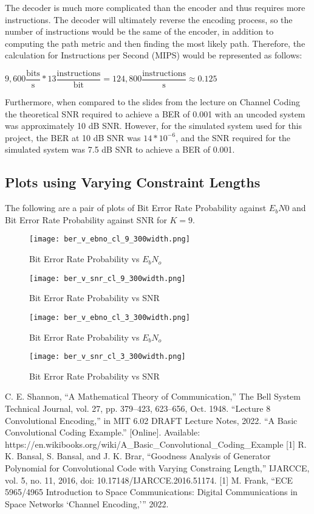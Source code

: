 \documentclass[conference]{IEEEtran}
\begin{document}
The decoder is much more complicated than the encoder and thus requires more instructions. The decoder will ultimately reverse the encoding process, so the number of instructions would be the same of the encoder, in addition to computing the path metric and then finding the most likely path. Therefore, the calculation for Instructions per Second (MIPS) would be represented as follows:
\begin{center}
    $9,600 \dfrac{\text{bits}}{\text{s}}*13\dfrac{\text{instructions}}{\text{bit}}=124,800 \dfrac{\text{instructions}}{\text{s}} \approx 0.125$
\end{center}


Furthermore, when compared to the slides from the lecture on Channel Coding \cite{b5} the theoretical SNR required to achieve a BER of 0.001 with an uncoded system was approximately 10 dB SNR. However, for the simulated system used for this project, the BER at 10 dB SNR was $14*10^{-6}$, and the SNR required for the simulated system was 7.5 dB SNR to achieve a BER of 0.001. 

\subsection{Plots using Varying Constraint Lengths}
The following are a pair of plots of Bit Error Rate Probability against $E_b N0$ and Bit Error Rate Probability against SNR for $K=9$. 
\begin{figure}[!ht]
\centerline{\texttt{[image: ber\_v\_ebno\_cl\_9\_300width.png]}}
\caption{Bit Error Rate Probability vs $E_b N_o$}
\label{fig:4}
\end{figure}
\begin{figure}[!ht]
\centerline{\texttt{[image: ber\_v\_snr\_cl\_9\_300width.png]}}
\caption{Bit Error Rate Probability vs SNR}
\label{fig:5}
\end{figure}

\begin{figure}[!ht]
\centerline{\texttt{[image: ber\_v\_ebno\_cl\_3\_300width.png]}}
\caption{Bit Error Rate Probability vs $E_b N_o$}
\label{fig:6}
\end{figure}
\begin{figure}[!ht]
\centerline{\texttt{[image: ber\_v\_snr\_cl\_3\_300width.png]}}
\caption{Bit Error Rate Probability vs SNR}
\label{fig:7}
\end{figure}

\begin{thebibliography}{00}
 C. E. Shannon, “A Mathematical Theory of Communication,” The Bell System Technical Journal, vol. 27, pp. 379–423, 623–656, Oct. 1948.
 “Lecture 8 Convolutional Encoding,” in MIT 6.02 DRAFT Lecture Notes, 2022.
 “A Basic Convolutional Coding Example.” [Online]. Available: https://en.wikibooks.org/wiki/A\_Basic\_Convolutional\_Coding\_Example
 [1] R. K. Bansal, S. Bansal, and J. K. Brar, “Goodness Analysis of Generator Polynomial for Convolutional Code with Varying Constraing Length,” IJARCCE, vol. 5, no. 11, 2016, doi: 10.17148/IJARCCE.2016.51174.
 [1] M. Frank, “ECE 5965/4965 Introduction to Space Communications: Digital Communications in Space Networks ‘Channel Encoding,’” 2022.


\end{thebibliography}
\end{document}
